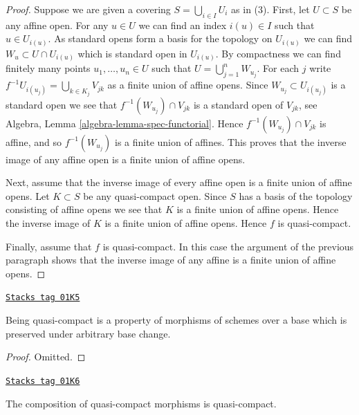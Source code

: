 \begin{proof}
Suppose we are given a covering $S = \bigcup_{i \in I} U_i$ as in (3).
First, let $U \subset S$ be any affine open. For any $u \in U$
we can find an index $i(u) \in I$ such that $u \in U_{i(u)}$.
As standard opens form a basis for the topology on $U_{i(u)}$ we can find
$W_u \subset U \cap U_{i(u)}$ which is standard open in $U_{i(u)}$.
By compactness we can find finitely many points $u_1, \ldots, u_n \in U$
such that $U = \bigcup_{j = 1}^n W_{u_j}$. For each $j$ write
$f^{-1}U_{i(u_j)} = \bigcup_{k \in K_j} V_{jk}$ as a finite
union of affine opens. Since $W_{u_j} \subset U_{i(u_j)}$ is a standard
open we see that $f^{-1}(W_{u_j}) \cap V_{jk}$ is a standard
open of $V_{jk}$, see Algebra, Lemma \ref{algebra-lemma-spec-functorial}.
Hence $f^{-1}(W_{u_j}) \cap V_{jk}$ is affine, and so
$f^{-1}(W_{u_j})$ is a finite union of affines. This proves that the
inverse image of any affine open is a finite union of affine opens.

\medskip\noindent
Next, assume that the inverse image of every affine open is a finite
union of affine opens.
Let $K \subset S$ be any quasi-compact open. Since $S$ has a basis
of the topology consisting of affine opens we see that $K$ is a finite
union of affine opens. Hence the inverse image of $K$ is a finite
union of affine opens. Hence $f$ is quasi-compact.

\medskip\noindent
Finally, assume that $f$ is quasi-compact. In this case the argument
of the previous paragraph shows that the inverse image of any affine
is a finite union of affine opens.
\end{proof}

\begin{lemma}
\label{schemes-lemma-quasi-compact-preserved-base-change}
\href{https://stacks.math.columbia.edu/tag/01K5}{\texttt{Stacks tag 01K5}}

Being quasi-compact is a property of morphisms of schemes
over a base which is preserved under arbitrary base change.
\end{lemma}

\begin{proof}
Omitted.
\end{proof}

\begin{lemma}
\label{schemes-lemma-composition-quasi-compact}
\href{https://stacks.math.columbia.edu/tag/01K6}{\texttt{Stacks tag 01K6}}

The composition of quasi-compact morphisms is quasi-compact.
\end{lemma}

